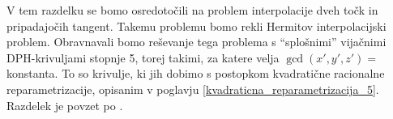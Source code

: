 \documentclass[12pt,a4paper,twoside]{article}
\theoremstyle{definition} %
\theoremstyle{plain} %
\theoremstyle{primerstyle}
\numberwithin{equation}{section}  %
\begin{document}
V tem razdelku se bomo osredotočili na problem interpolacije dveh točk in pripadajočih tangent. Takemu problemu bomo rekli Hermitov interpolacijski problem. Obravnavali bomo reševanje tega problema s ``splošnimi'' vijačnimi DPH-krivuljami stopnje 5, torej takimi, za katere velja $\gcd(x',y',z')=$ konstanta. To so krivulje, ki jih dobimo s postopkom kvadratične racionalne reparametrizacije, opisanim v poglavju \ref{kvadraticna_reparametrizacija_5}. Razdelek je povzet po \cite{faroukietal2004}.%

\end{document}
